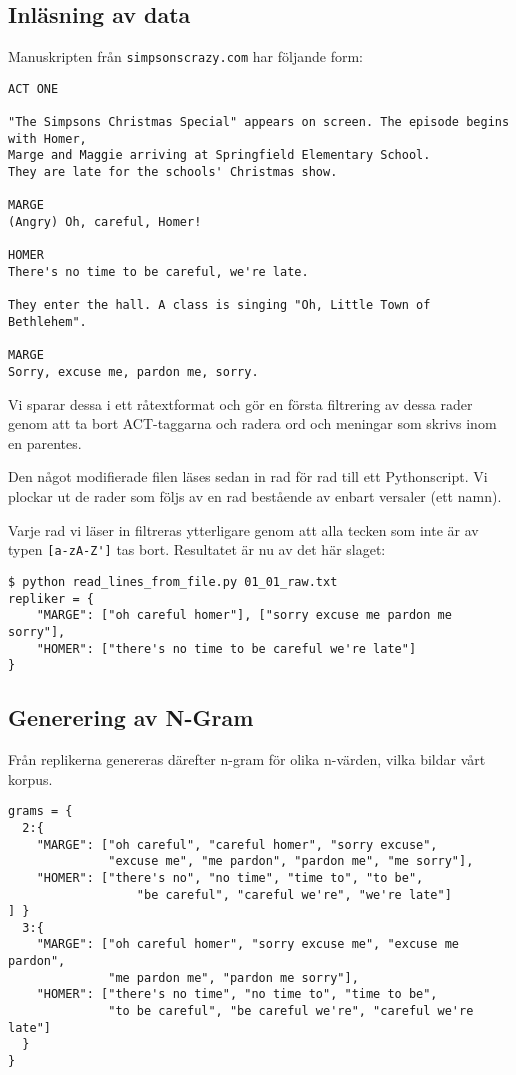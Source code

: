 \documentclass[a4paper]{article}
\begin{document}
\subsection{Inläsning av data}
Manuskripten från \nolinkurl{simpsonscrazy.com} har följande form:
\begin{verbatim}
ACT ONE

"The Simpsons Christmas Special" appears on screen. The episode begins with Homer,
Marge and Maggie arriving at Springfield Elementary School.
They are late for the schools' Christmas show.

MARGE
(Angry) Oh, careful, Homer!

HOMER
There's no time to be careful, we're late.

They enter the hall. A class is singing "Oh, Little Town of Bethlehem".

MARGE
Sorry, excuse me, pardon me, sorry.
\end{verbatim}

Vi sparar dessa i ett råtextformat och gör en första filtrering av
dessa rader genom att ta bort ACT-taggarna och radera ord och meningar
som skrivs inom en parentes.

Den något modifierade filen läses sedan in rad för rad till ett
Pythonscript. Vi plockar ut de rader som följs av en rad bestående av
enbart versaler (ett namn).

Varje rad vi läser in filtreras ytterligare genom att alla tecken som
inte är av typen \verb=[a-zA-Z']= tas bort. Resultatet är nu av det
här slaget:

\begin{verbatim}
$ python read_lines_from_file.py 01_01_raw.txt
repliker = {
    "MARGE": ["oh careful homer"], ["sorry excuse me pardon me sorry"],
    "HOMER": ["there's no time to be careful we're late"]
}
\end{verbatim}

\subsection{Generering av N-Gram}
Från replikerna genereras därefter n-gram för olika n-värden, vilka
bildar vårt korpus.

\begin{verbatim}
grams = {
  2:{
    "MARGE": ["oh careful", "careful homer", "sorry excuse",
              "excuse me", "me pardon", "pardon me", "me sorry"],
    "HOMER": ["there's no", "no time", "time to", "to be",
                  "be careful", "careful we're", "we're late"]
] }
  3:{
    "MARGE": ["oh careful homer", "sorry excuse me", "excuse me pardon",
              "me pardon me", "pardon me sorry"],
    "HOMER": ["there's no time", "no time to", "time to be",
              "to be careful", "be careful we're", "careful we're late"]
  }
}
\end{verbatim}
\end{document}
